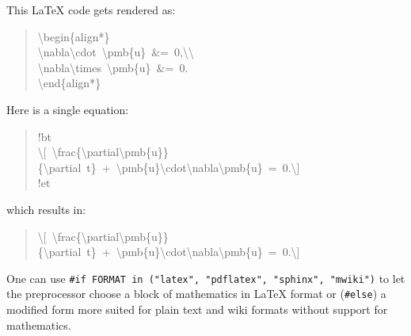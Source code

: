 \documentclass[a4paper]{article}
\begin{document}



This LaTeX code gets rendered as:
%
\begin{quote}{\ttfamily \raggedright \noindent
\textbackslash{}begin\{align*\}\\
\textbackslash{}nabla\textbackslash{}cdot~\textbackslash{}pmb\{u\}~\&=~0,\textbackslash{}\textbackslash{}\\
\textbackslash{}nabla\textbackslash{}times~\textbackslash{}pmb\{u\}~\&=~0.\\
\textbackslash{}end\{align*\}
}
\end{quote}

Here is a single equation:
%
\begin{quote}{\ttfamily \raggedright \noindent
!bt\\
\textbackslash{}{[}~\textbackslash{}frac\{\textbackslash{}partial\textbackslash{}pmb\{u\}\}\{\textbackslash{}partial~t\}~+~\textbackslash{}pmb\{u\}\textbackslash{}cdot\textbackslash{}nabla\textbackslash{}pmb\{u\}~=~0.\textbackslash{}{]}\\
!et
}
\end{quote}

which results in:
%
\begin{quote}{\ttfamily \raggedright \noindent
\textbackslash{}{[}~\textbackslash{}frac\{\textbackslash{}partial\textbackslash{}pmb\{u\}\}\{\textbackslash{}partial~t\}~+~\textbackslash{}pmb\{u\}\textbackslash{}cdot\textbackslash{}nabla\textbackslash{}pmb\{u\}~=~0.\textbackslash{}{]}
}
\end{quote}

One can use \texttt{\#if FORMAT in ("latex", "pdflatex", "sphinx", "mwiki")} to let
the preprocessor choose a block of mathematics in LaTeX format
or (\texttt{\#else}) a modified form more suited for plain text and wiki
formats without support for mathematics.
\end{document}
